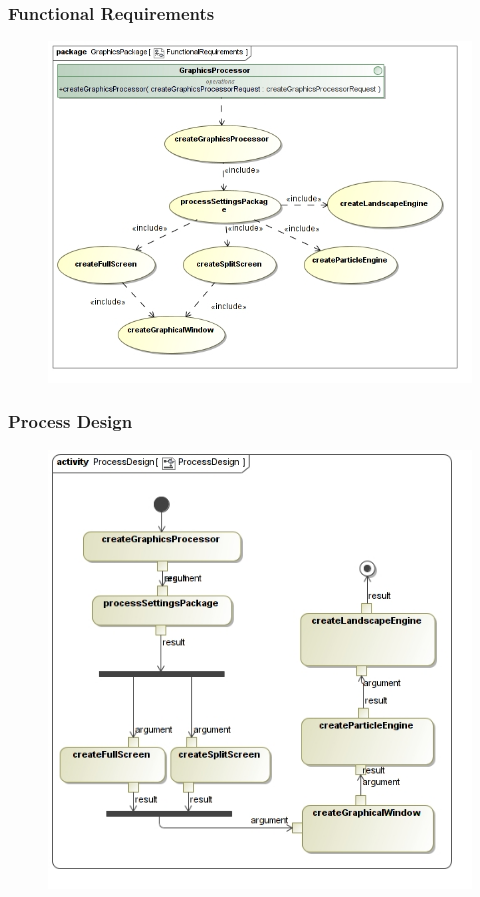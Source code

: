 \documentclass[11pt]{article}
\begin{document}
\subsubsection{Functional Requirements}
\begin{figure}[h]
\includegraphics[scale=0.45]{GraphicsProcessor/FunctionalRequirements.jpg}
\end{figure}

\subsubsection{Process Design}
\begin{figure}[h]
\includegraphics[scale=0.45]{GraphicsProcessor/ProcessDesign.jpg}
\end{figure}
\end{document}
